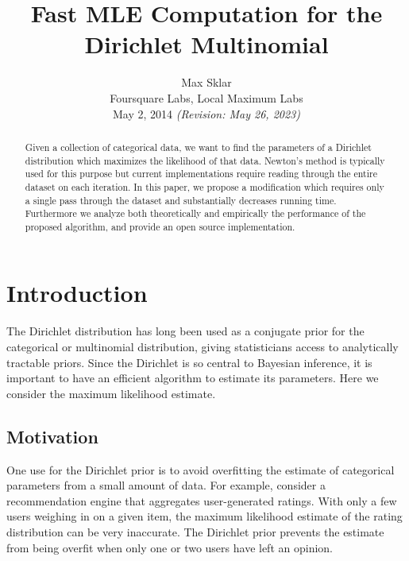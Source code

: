 \documentclass[twoside]{article}
\begin{document}
\parindent=0in
\parskip=12pt

%
%
%
%

\title{Fast MLE Computation for the Dirichlet Multinomial}

\author{Max Sklar\\
Foursquare Labs, Local Maximum Labs\\
May 2, 2014 \small{\textit{(Revision: May 26, 2023)}}
}

\date{} 

\maketitle
\thispagestyle{empty}

\begin{abstract}
Given a collection of categorical data, we want to find the parameters of a Dirichlet distribution which maximizes the likelihood of that data.  Newton's method is typically used for this purpose but current implementations require reading through the entire dataset on each iteration.  In this paper, we propose a modification which requires only a single pass through the dataset and substantially decreases running time.  Furthermore we analyze both theoretically and empirically the performance of the proposed algorithm, and provide an open source implementation.
\end{abstract}

\section{Introduction}

The Dirichlet distribution has long been used as a conjugate prior for the categorical or multinomial distribution, giving statisticians access to analytically tractable priors. Since the Dirichlet is so central to Bayesian inference, it is important to have an efficient algorithm to estimate its parameters. Here we consider the maximum likelihood estimate.

\subsection{Motivation}

One use for the Dirichlet prior is to avoid overfitting the estimate of categorical parameters from a small amount of data.  For example, consider a recommendation engine that aggregates user-generated ratings. With only a few users weighing in on a given item, the maximum likelihood estimate of the rating distribution can be very inaccurate. The Dirichlet prior prevents the estimate from being overfit when only one or two users have left an opinion.
\end{document}
